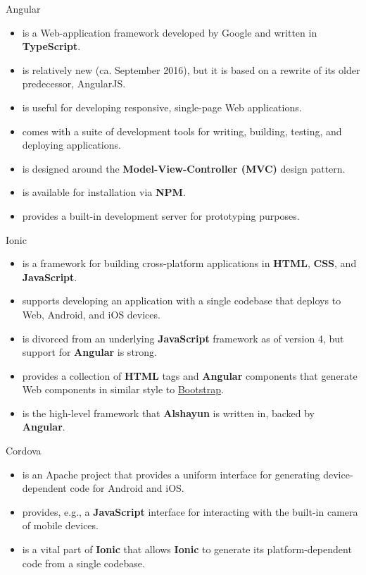\documentclass{beamer}
\begin{document}
\begin{frame}{Angular}
    \begin{itemize}[font=$\bullet$\scshape\bfseries]
        \item is a Web-application framework developed by Google and written in
            \textbf{TypeScript}.
        \item is relatively new (ca. September 2016), but it is based on a
            rewrite of its older predecessor, AngularJS.
        \item is useful for developing responsive, single-page Web applications.
        \item comes with a suite of development tools for writing, building,
            testing, and deploying applications.
        \item is designed around the \textbf{Model-View-Controller (MVC)} design
            pattern.
        \item is available for installation via \textbf{NPM}.
        \item provides a built-in development server for prototyping purposes.
    \end{itemize}
\end{frame}

\begin{frame}{Ionic}
    \begin{itemize}[font=$\bullet$\scshape\bfseries]
        \item is a framework for building cross-platform applications in
            \textbf{HTML}, \textbf{CSS}, and \textbf{JavaScript}.
        \item supports developing an application with a single codebase that
            deploys to Web, Android, and iOS devices.
        \item is divorced from an underlying \textbf{JavaScript} framework as of
            version 4, but support for \textbf{Angular} is strong.
        \item provides a collection of \textbf{HTML} tags and \textbf{Angular}
            components that generate Web components in similar style to
            \href{https://getbootstrap.com/}{Bootstrap}.
        \item is the high-level framework that \textbf{Alshayun} is written in,
            backed by \textbf{Angular}.
    \end{itemize}
\end{frame}

\begin{frame}{Cordova}
    \begin{itemize}[font=$\bullet$\scshape\bfseries]
        \item is an Apache project that provides a uniform interface for
            generating device-dependent code for Android and iOS.
        \item provides, e.g., a \textbf{JavaScript} interface for interacting
            with the built-in camera of mobile devices.
        \item is a vital part of \textbf{Ionic} that allows \textbf{Ionic} to
            generate its platform-dependent code from a single codebase.
    \end{itemize}
\end{frame}
\end{document}
